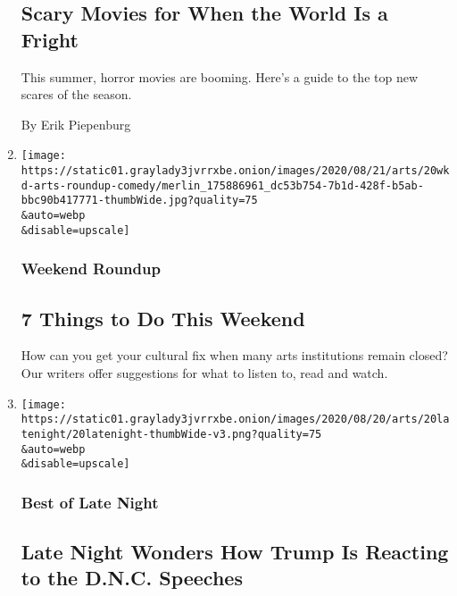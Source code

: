 \begin{enumerate}
{  \subsection{Scary Movies for When the World Is a
  Fright}\label{scary-movies-for-when-the-world-is-a-fright}}

  This summer, horror movies are booming. Here's a guide to the top new
  scares of the season.

  By Erik Piepenburg
\item
  \href{/2020/08/20/arts/things-to-do-weekend-coronavirus.html}{}

  \texttt{[image: https://static01.graylady3jvrrxbe.onion/images/2020/08/21/arts/20wkd-arts-roundup-comedy/merlin\_175886961\_dc53b754-7b1d-428f-b5ab-bbc90b417771-thumbWide.jpg?quality=75\\\&auto=webp\\\&disable=upscale]}

  \hypertarget{weekend-roundup}{%
  \subsubsection{Weekend Roundup}\label{weekend-roundup}}

  \hypertarget{7-things-to-do-this-weekend}{%
  \subsection{7 Things to Do This
  Weekend}\label{7-things-to-do-this-weekend}}

  How can you get your cultural fix when many arts institutions remain
  closed? Our writers offer suggestions for what to listen to, read and
  watch.
\item
  \href{/2020/08/20/arts/television/late-night-trump-obama-clinton-dnc.html}{}

  \texttt{[image: https://static01.graylady3jvrrxbe.onion/images/2020/08/20/arts/20latenight/20latenight-thumbWide-v3.png?quality=75\\\&auto=webp\\\&disable=upscale]}

  \hypertarget{best-of-late-night-1}{%
  \subsubsection{Best of Late Night}\label{best-of-late-night-1}}

  \hypertarget{late-night-wonders-how-trump-is-reacting-to-the-dnc-speeches}{%
  \subsection{Late Night Wonders How Trump Is Reacting to the D.N.C.
  Speeches}\label{late-night-wonders-how-trump-is-reacting-to-the-dnc-speeches}}


\end{enumerate}
